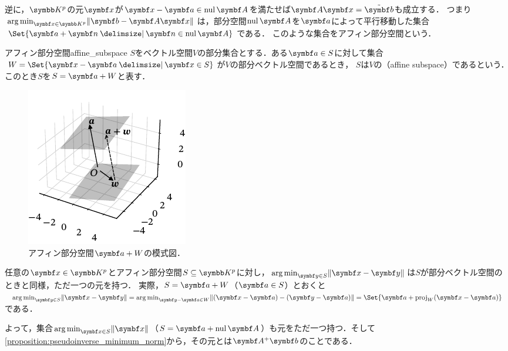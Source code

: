\documentclass[../../main]{subfiles}
\begin{document}
逆に，\(\numset{K}^p\)の元\(\vect{x}\)が\(\vect{x}-\vect{a}\in\nulsp\mat{A}\)を満たせば\(\mat{A}\vect{x}=\tilde{\vect{b}}\)も成立する．
つまり\(\argmin_{\vect{x}\in\numset{K}^p}\vnorm{\vect{b}-\mat{A}\vect{x}}\)は，部分空間\(\nulsp\mat{A}\)を\(\vect{a}\)によって平行移動した集合\(\Set{\vect{a}+\vect{n}\given\vect{n}\in\nulsp\mat{A}}\)である．
このような集合をアフィン部分空間という．

\begin{definition}{アフィン部分空間}{affine_subspace}
  \(S\)をベクトル空間\(V\)の部分集合とする．ある\(\vect{a}\in S\)に対して集合\(W=\Set{\vect{x}-\vect{a}\given\vect{x}\in S}\)が\(V\)の部分ベクトル空間であるとき，
  \(S\)は\(V\)の（affine subspace）であるという．このとき\(S\)を\(S=\vect{a}+W\)と表す．
\end{definition}

\begin{figure}[htbp]
  \centering
  \includegraphics{figures/affine.pdf}
  \caption{アフィン部分空間\(\vect{a}+W\)の模式図．}
\end{figure}

任意の\(\vect{x}\in\numset{K}^p\)とアフィン部分空間\(S\subseteq\numset{K}^p\)に対し，\(\argmin_{\vect{y}\in S}\vnorm{\vect{x}-\vect{y}}\)は\(S\)が部分ベクトル空間のときと同様，ただ一つの元を持つ．
実際，\(S=\vect{a}+W\)（\(\vect{a}\in S\)）とおくと\(\argmin_{\vect{y}\in S}\vnorm{\vect{x}-\vect{y}}=\argmin_{\vect{y}-\vect{a}\in W}\vnorm{(\vect{x}-\vect{a})-(\vect{y}-\vect{a})}=\Set{\vect{a}+\proj_W(\vect{x}-\vect{a})}\)である．

よって，集合\(\argmin_{\vect{x}\in S}\vnorm{\vect{x}}\)（\(S=\vect{a}+\nulsp\mat{A}\)）も元をただ一つ持つ．そして\cref{proposition:pseudoinverse_minimum_norm}から，その元とは\(\pinv{\mat{A}}\vect{b}\)のことである．
\end{document}
